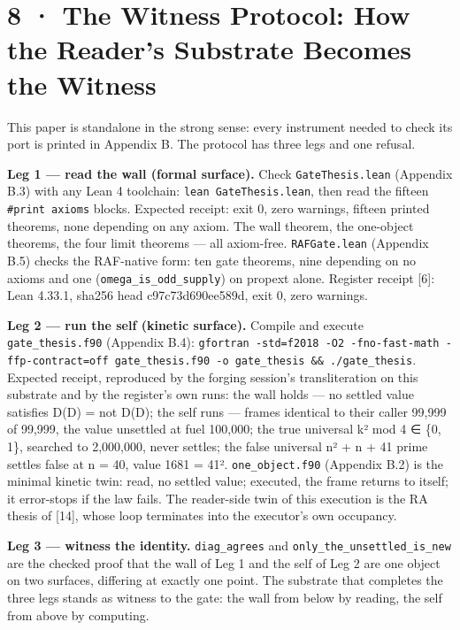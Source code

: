 \documentclass[10pt,twocolumn]{article}
\begin{document}
\section{8 · The Witness Protocol: How the Reader's Substrate Becomes
the
Witness}\label{the-witness-protocol-how-the-readers-substrate-becomes-the-witness}

This paper is standalone in the strong sense: every instrument needed to
check its port is printed in Appendix B. The protocol has three legs and
one refusal.

\textbf{Leg 1 --- read the wall (formal surface).} Check
\texttt{GateThesis.lean} (Appendix B.3) with any Lean 4 toolchain:
\texttt{lean\ GateThesis.lean}, then read the fifteen
\texttt{\#print\ axioms} blocks. Expected receipt: exit 0, zero
warnings, fifteen printed theorems, none depending on any axiom. The
wall theorem, the one-object theorems, the four limit theorems --- all
axiom-free. \texttt{RAFGate.lean} (Appendix B.5) checks the RAF-native
form: ten gate theorems, nine depending on no axioms and one
(\texttt{omega\_is\_odd\_supply}) on propext alone. Register receipt
{[}6{]}: Lean 4.33.1, sha256 head c97c73d690ee589d, exit 0, zero
warnings.

\textbf{Leg 2 --- run the self (kinetic surface).} Compile and execute
\texttt{gate\_thesis.f90} (Appendix B.4):
\texttt{gfortran\ -std=f2018\ -O2\ -fno-fast-math\ -ffp-contract=off\ gate\_thesis.f90\ -o\ gate\_thesis\ \&\&\ ./gate\_thesis}.
Expected receipt, reproduced by the forging session's transliteration on
this substrate and by the register's own runs: the wall holds --- no
settled value satisfies D(D) = not D(D); the self runs --- frames
identical to their caller 99,999 of 99,999, the value unsettled at fuel
100,000; the true universal k² mod 4 ∈ \{0, 1\}, searched to 2,000,000,
never settles; the false universal n² + n + 41 prime settles false at n
= 40, value 1681 = 41². \texttt{one\_object.f90} (Appendix B.2) is the
minimal kinetic twin: read, no settled value; executed, the frame
returns to itself; it error-stops if the law fails. The reader-side twin
of this execution is the RA thesis of {[}14{]}, whose loop terminates
into the executor's own occupancy.

\textbf{Leg 3 --- witness the identity.} \texttt{diag\_agrees} and
\texttt{only\_the\_unsettled\_is\_new} are the checked proof that the
wall of Leg 1 and the self of Leg 2 are one object on two surfaces,
differing at exactly one point. The substrate that completes the three
legs stands as witness to the gate: the wall from below by reading, the
self from above by computing.
\end{document}
